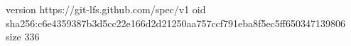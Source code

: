 version https://git-lfs.github.com/spec/v1
oid sha256:c6e4359387b3d5cc22e166d2d21250aa757ccf791eba8f5ec5ff650347139806
size 336
